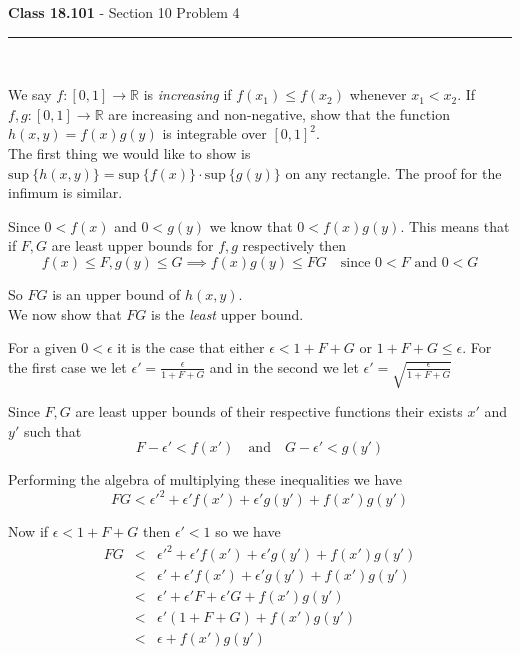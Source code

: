 \documentclass[11pt,reqno]{article}
\begin{document}
\begin{flushleft} 
\textbf{Class 18.101} - Section 10 Problem 4\\
\rule{500pt}{1pt}\\
\end{flushleft} 


We say $f : [0,1] \to \mathbb{R}$ is \emph{increasing} if $f(x_1) \le f(x_2)$ whenever $x_1 < x_2$. If $f,g : [0,1] \to \mathbb{R}$ are increasing and non-negative, show that the function $h(x,y) = f(x)g(y)$ is integrable over $[0,1]^2$.\\

The first thing we would like to show is $\text{sup} \: \{ h(x,y) \} = \text{sup} \: \{ f(x) \} \cdot \text{sup} \: \{ g(y) \}$ on any rectangle. The proof for the infimum is similar.

Since $0 < f(x)$ and $0 < g(y)$ we know that $0 < f(x) g(y)$. This means that if $F,G$ are least upper bounds for $f,g$ respectively then
\[ f(x) \le F, g(y) \le G \implies f(x) g(y) \le F G \quad \text{since $0 < F$ and $0 < G$} \]

\noindent So $FG$ is an upper bound of $h(x,y)$.\\
We now show that $FG$ is the \emph{least} upper bound.

For a given $0 < \epsilon$ it is the case that either $\epsilon < 1 + F + G$ or $1 + F + G \le \epsilon$. For the first case we let $\epsilon' = \frac{\epsilon}{1+ F + G}$ and in the second we let $\epsilon' =  \sqrt{\frac{\epsilon}{1+ F + G}}$

\noindent Since $F,G$ are least upper bounds of their respective functions their exists $x'$ and $y'$ such that 
\[ F - \epsilon' < f(x') \quad \text{and} \quad G - \epsilon' < g(y') \]

\noindent Performing the algebra of multiplying these inequalities we have 
\[ FG < \epsilon'^2 + \epsilon' f(x') + \epsilon' g(y') + f(x') g(y') \]

\noindent Now if $\epsilon < 1+F+G$ then $\epsilon' < 1$ so we have 
\begin{eqnarray*}
FG &<& \epsilon'^2 + \epsilon' f(x') + \epsilon' g(y') + f(x') g(y') \\
&<& \epsilon' + \epsilon' f(x') + \epsilon' g(y') + f(x') g(y') \\
&<& \epsilon' + \epsilon' F + \epsilon' G + f(x') g(y') \\
&<& \epsilon' (1 + F + G) + f(x') g(y') \\
&<& \epsilon + f(x') g(y') \\
\end{eqnarray*}
\end{document}
